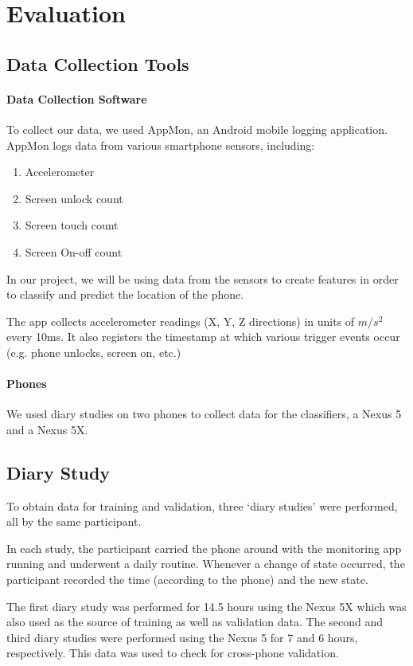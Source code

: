 \section{Evaluation}

\subsection{Data Collection Tools}
\paragraph{Data Collection Software}
To collect our data, we used AppMon, an Android mobile logging application.
AppMon logs data from various smartphone sensors, including:
\begin{enumerate}
\item Accelerometer
\item Screen unlock count
\item Screen touch count
\item Screen On-off count
\end{enumerate}

In our project, we will be using data from the sensors
to create features in order to classify and predict the location of the phone. 

The app collects accelerometer readings (X, Y, Z directions) in units of $m/s^2$ every 10ms.
It also registers the timestamp at which various trigger events occur (e.g. phone unlocks, screen on, etc.)

\paragraph{Phones}
We used diary studies on two phones to collect data for the classifiers,
 a Nexus 5 and a Nexus 5X.


\subsection {Diary Study}
To obtain data for training and validation, three `diary studies' were performed, all by the same participant.

In each study, the participant carried the phone around with the monitoring app running and underwent a daily routine.
Whenever a change of state occurred, the participant recorded the time (according to the phone) and the new state.

The first diary study was performed for 14.5 hours using the Nexus 5X which was also used as the source of training as well as validation data.
The second and third diary studies were performed using the Nexus 5 for 7 and 6 hours, respectively.
This data was used to check for cross-phone validation.


